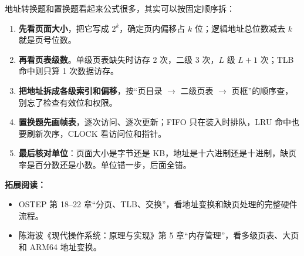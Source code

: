 地址转换题和置换题看起来公式很多，其实可以按固定顺序拆：

\begin{enumerate}
  \item \textbf{先看页面大小}，把它写成 $2^k$，确定页内偏移占 $k$ 位；逻辑地址总位数减去 $k$ 就是页号位数。
  \item \textbf{再看页表级数}。单级页表缺失时访存 2 次，二级 3 次，$L$ 级 $L+1$ 次；TLB 命中则只算 1 次数据访存。
  \item \textbf{把地址拆成各级索引和偏移}，按“页目录 $\to$ 二级页表 $\to$ 页框”的顺序查，别忘了检查有效位和权限。
  \item \textbf{置换题先画帧表}，逐次访问、逐次更新；FIFO 只在装入时排队，LRU 命中也要刷新次序，CLOCK 看访问位和指针。
  \item \textbf{最后核对单位}：页面大小是字节还是 KB，地址是十六进制还是十进制，缺页率是百分数还是小数。单位错一步，后面全错。
\end{enumerate}

\noindent\textbf{拓展阅读：}
\begin{itemize}
  \item OSTEP 第 18--22 章“分页、TLB、交换”，看地址变换和缺页处理的完整硬件流程。
  \item 陈海波《现代操作系统：原理与实现》第 5 章“内存管理”，看多级页表、大页和 ARM64 地址变换。
\end{itemize}

\newpage

